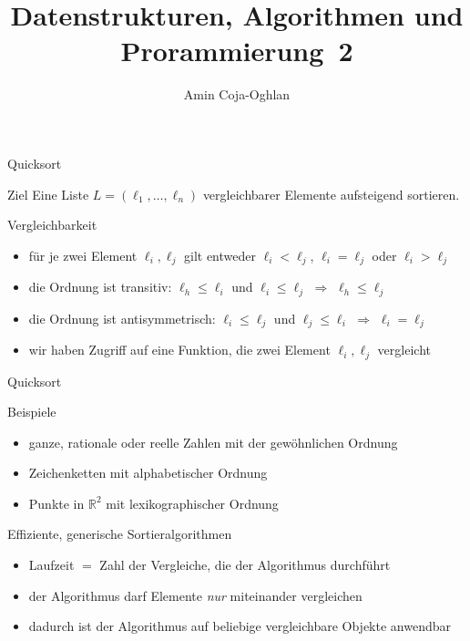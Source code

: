 \documentclass[aspectratio=1610, 11pt]{beamer}
\title{Datenstrukturen, Algorithmen und Prorammierung~2}
\author[A.~Coja-Oghlan]{Amin Coja-Oghlan}
\institute[DAP2]{Lehrstuhl Informatik 2\\Fakult\"at f\"ur Informatik}
\newcommand\RR{\mathbb R}
\begin{document}
\maketitle

\begin{frame}{Quicksort}
	\begin{block}{Ziel}
			Eine Liste $L=(\ell_1,\ldots,\ell_n)$ \alert{vergleichbarer} Elemente aufsteigend sortieren.
	\end{block}
\begin{exampleblock}{Vergleichbarkeit}
	\begin{itemize}
		\item f\"ur je zwei Element $\ell_i,\ell_j$ gilt entweder $\ell_i<\ell_j$, $\ell_i=\ell_j$ oder $\ell_i>\ell_j$
		\item die Ordnung ist \alert{transitiv}: $\ell_h\leq\ell_i$ und $\ell_i\leq\ell_j$ $\Rightarrow$ $\ell_h\leq\ell_j$
	\item die Ordnung ist \alert{antisymmetrisch}: $\ell_i\leq\ell_j$ und $\ell_j\leq\ell_i$ $\Rightarrow$ $\ell_i=\ell_j$
	\item wir haben Zugriff auf eine Funktion, die zwei Element $\ell_i,\ell_j$ vergleicht
	\end{itemize}
	\end{exampleblock}
\end{frame}

\begin{frame}{Quicksort}
\begin{exampleblock}{Beispiele}
	\begin{itemize}
		\item ganze, rationale oder reelle Zahlen mit der gew\"ohnlichen Ordnung
		\item Zeichenketten mit alphabetischer Ordnung
		\item Punkte in $\RR^2$ mit lexikographischer Ordnung
	\end{itemize}
\end{exampleblock}
\begin{exampleblock}{Effiziente, generische Sortieralgorithmen}
	\begin{itemize}
		\item Laufzeit $=$ Zahl der \alert{Vergleiche}, die der Algorithmus durchf\"uhrt
		\item der Algorithmus darf Elemente \emph{nur} miteinander vergleichen
		\item dadurch ist der Algorithmus auf beliebige vergleichbare Objekte anwendbar
	\end{itemize}
\end{exampleblock}
\end{frame}
\end{document}
